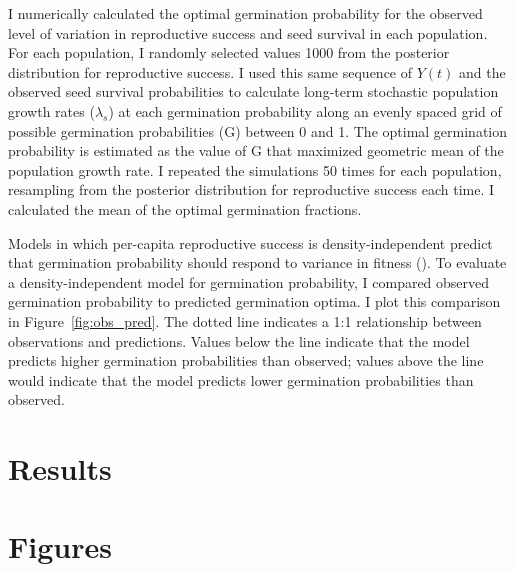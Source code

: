\documentclass[12pt, oneside, titlepage]{article}   	%
\begin{document}
I numerically calculated the optimal germination probability for the observed level of variation in reproductive success and seed survival in each population. For each population, I randomly selected values 1000 from the posterior distribution for reproductive success. I used this same sequence of $Y(t)$ and the observed seed survival probabilities to calculate long-term stochastic population growth rates ($\lambda_s$) at each germination probability along an evenly spaced grid of possible germination probabilities (G) between 0 and 1. The optimal germination probability is estimated as the value of G that maximized geometric mean of the population growth rate. I repeated the simulations 50 times for each population, resampling from the posterior distribution for reproductive success each time. I calculated the mean of the optimal germination fractions. 

Models in which per-capita reproductive success is density-independent predict that germination probability should respond to variance in fitness (\cite{cohen1966}). To evaluate a density-independent model for germination probability, I compared observed germination probability to predicted germination optima. I plot this comparison in Figure~\ref{fig:obs_pred}. The dotted line indicates a 1:1 relationship between observations and predictions. Values below the line indicate that the model predicts higher germination probabilities than observed; values above the line would indicate that the model predicts lower germination probabilities than observed.

\section*{Results}

\newpage
\section*{Figures} 
\end{document}
